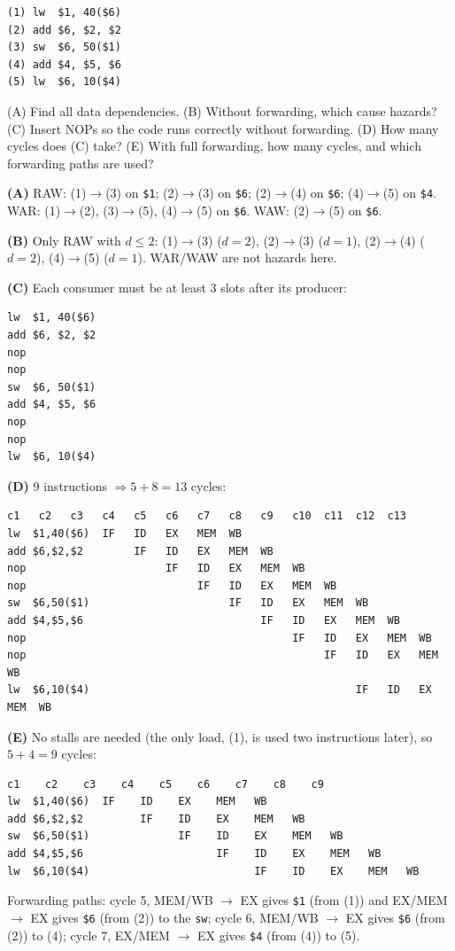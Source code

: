 \begin{exercise}
\leavevmode
\begin{lstlisting}
(1) lw  $1, 40($6)
(2) add $6, $2, $2
(3) sw  $6, 50($1)
(4) add $4, $5, $6
(5) lw  $6, 10($4)
\end{lstlisting}
(A) Find all data dependencies. (B) Without forwarding, which cause hazards?
(C) Insert NOPs so the code runs correctly without forwarding. (D) How many
cycles does (C) take? (E) With full forwarding, how many cycles, and which
forwarding paths are used?
\end{exercise}
\begin{solution}
\textbf{(A)} RAW: (1)$\to$(3) on \texttt{\$1}; (2)$\to$(3) on \texttt{\$6};
(2)$\to$(4) on \texttt{\$6}; (4)$\to$(5) on \texttt{\$4}.
WAR: (1)$\to$(2), (3)$\to$(5), (4)$\to$(5) on \texttt{\$6}.
WAW: (2)$\to$(5) on \texttt{\$6}.

\textbf{(B)} Only RAW with $d\le2$: (1)$\to$(3) ($d=2$), (2)$\to$(3)
($d=1$), (2)$\to$(4) ($d=2$), (4)$\to$(5) ($d=1$). WAR/WAW are not hazards
here.

\textbf{(C)} Each consumer must be at least 3 slots after its producer:
\begin{lstlisting}
lw  $1, 40($6)
add $6, $2, $2
nop
nop
sw  $6, 50($1)
add $4, $5, $6
nop
nop
lw  $6, 10($4)
\end{lstlisting}
\textbf{(D)} 9 instructions $\Rightarrow 5 + 8 = 13$ cycles:
\begin{lstlisting}[basicstyle=\ttfamily\scriptsize,keywords={}]
               c1   c2   c3   c4   c5   c6   c7   c8   c9   c10  c11  c12  c13
lw  $1,40($6)  IF   ID   EX   MEM  WB
add $6,$2,$2        IF   ID   EX   MEM  WB
nop                      IF   ID   EX   MEM  WB
nop                           IF   ID   EX   MEM  WB
sw  $6,50($1)                      IF   ID   EX   MEM  WB
add $4,$5,$6                            IF   ID   EX   MEM  WB
nop                                          IF   ID   EX   MEM  WB
nop                                               IF   ID   EX   MEM  WB
lw  $6,10($4)                                          IF   ID   EX   MEM  WB
\end{lstlisting}

\textbf{(E)} No stalls are needed (the only load, (1), is used two
instructions later), so $5+4 = 9$ cycles:
\begin{lstlisting}[basicstyle=\ttfamily\footnotesize,keywords={}]
               c1    c2    c3    c4    c5    c6    c7    c8    c9
lw  $1,40($6)  IF    ID    EX    MEM   WB
add $6,$2,$2         IF    ID    EX    MEM   WB
sw  $6,50($1)              IF    ID    EX    MEM   WB
add $4,$5,$6                     IF    ID    EX    MEM   WB
lw  $6,10($4)                          IF    ID    EX    MEM   WB
\end{lstlisting}
Forwarding paths: cycle 5, MEM/WB $\to$ EX gives \texttt{\$1} (from (1)) and
EX/MEM $\to$ EX gives \texttt{\$6} (from (2)) to the \texttt{sw}; cycle 6,
MEM/WB $\to$ EX gives \texttt{\$6} (from (2)) to (4); cycle 7, EX/MEM $\to$
EX gives \texttt{\$4} (from (4)) to (5).
\end{solution}

